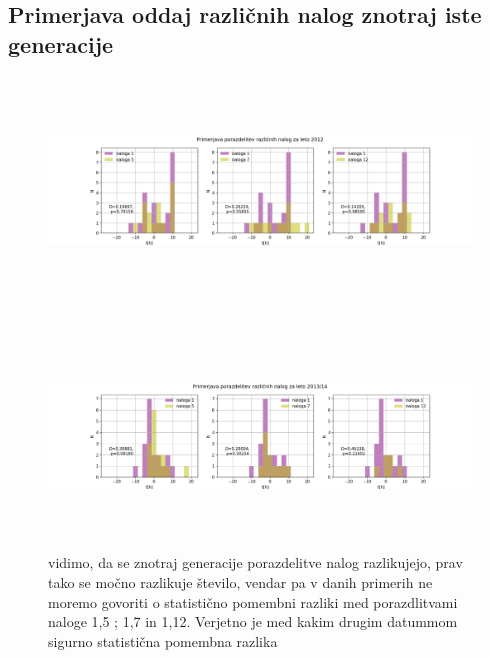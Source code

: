 \documentclass[11pt, a4paper]{article}
\begin{document}
\subsection{Primerjava oddaj različnih nalog znotraj iste generacije}
\begin{figure}[H]
\hspace*{-2.5cm}  
  \includegraphics[width=22cm,height=6cm]{tretja_primerjava_2012.png}
 
\end{figure}
\begin{figure}[H]
\hspace*{-2.5cm}  
  \includegraphics[width=22cm,height=6cm]{tretja_primerjava_2013.png}
  \caption{vidimo, da se znotraj generacije porazdelitve nalog razlikujejo, prav tako se močno razlikuje število, vendar pa v danih primerih ne moremo govoriti o statistično pomembni razliki med porazdlitvami naloge 1,5 ; 1,7 in 1,12. Verjetno je med kakim drugim datummom sigurno statistična pomembna razlika}
 
\end{figure}
\end{document}
